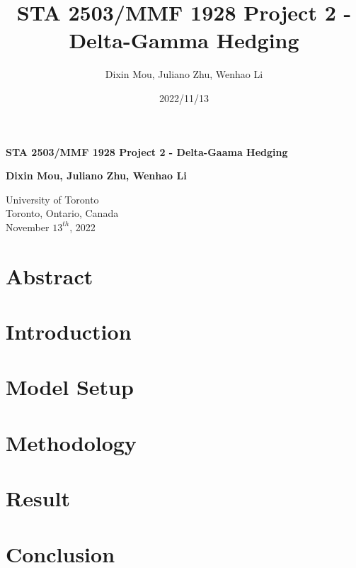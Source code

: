 \documentclass[12pt]{article}
\title{STA 2503/MMF 1928 Project 2 - Delta-Gamma Hedging}
\author{Dixin Mou, Juliano Zhu, Wenhao Li}
\date{2022/11/13}
\begin{document}
\begin{titlepage}
  \begin{center}
      \vspace*{7cm}

      \textbf{STA 2503/MMF 1928 Project 2 - Delta-Gaama Hedging}

           
      \vspace{1.5cm}

      \textbf{Dixin Mou, Juliano Zhu, Wenhao Li}

      \vfill
           
           
      \vspace{0.8cm}
           
      University of Toronto\\
      Toronto, Ontario, Canada\\
      November $13^{th}$, 2022 
           
  \end{center}
\end{titlepage}


\section{Abstract}


\newpage
\tableofcontents

\newpage
\listoffigures

\newpage
\section{Introduction}


\section{Model Setup}



\section{Methodology}


\section{Result}


\section{Conclusion}
\end{document}
